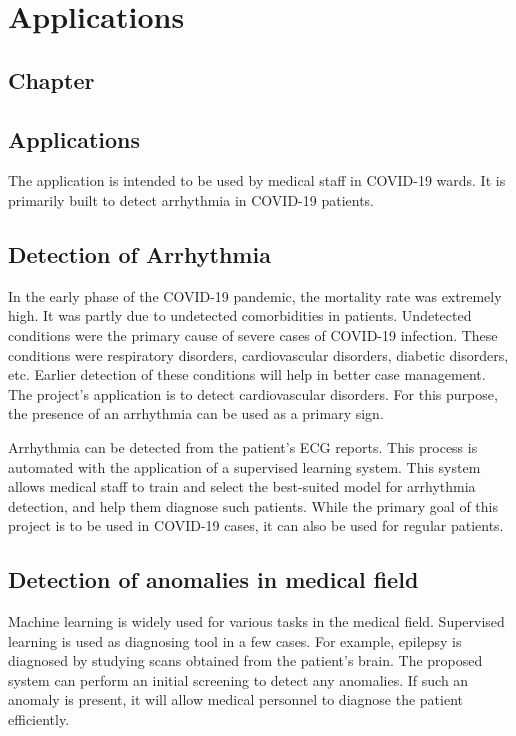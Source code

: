 \thispagestyle{fancy}
\chapter{Applications} \label{ch:applications}
\section*{\centering Chapter \thechapter}
\section*{\centering Applications}

The application is intended to be used by medical staff in COVID-19 wards. It is primarily built to detect arrhythmia in COVID-19 patients.

\section{Detection of Arrhythmia} \label{sec:detection_of_arrhythmia}
In the early phase of the COVID-19 pandemic, the mortality rate was extremely high. It was partly due to undetected comorbidities in patients. Undetected conditions were the primary cause of severe cases of COVID-19 infection. These conditions were respiratory disorders, cardiovascular disorders, diabetic disorders, etc. Earlier detection of these conditions will help in better case management. The project's application is to detect cardiovascular disorders. For this purpose, the presence of an arrhythmia can be used as a primary sign.

Arrhythmia can be detected from the patient's ECG reports. This process is automated with the application of a supervised learning system. This system allows medical staff to train and select the best-suited model for arrhythmia detection, and help them diagnose such patients. While the primary goal of this project is to be used in COVID-19 cases, it can also be used for regular patients.

\section{Detection of anomalies in medical field} \label{sec:detection_of_anomalies_in_medica_field}
Machine learning is widely used for various tasks in the medical field. Supervised learning is used as diagnosing tool in a few cases. For example, epilepsy is diagnosed by studying scans obtained from the patient's brain. The proposed system can perform an initial screening to detect any anomalies. If such an anomaly is present, it will allow medical personnel to diagnose the patient efficiently.

